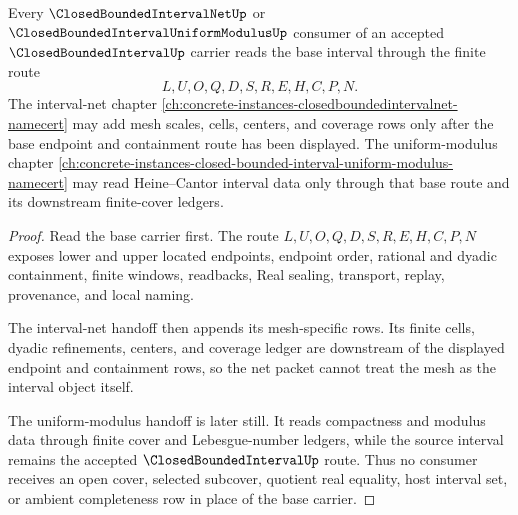 \begin{theorem}
\label{thm:closed-bounded-interval-net-handoff}
Every $\ClosedBoundedIntervalNetUp$ or $\ClosedBoundedIntervalUniformModulusUp$ consumer of an accepted $\ClosedBoundedIntervalUp$ carrier reads the base interval through the finite route
$$
L,U,O,Q,D,S,R,E,H,C,P,N.
$$
The interval-net chapter \autoref{ch:concrete-instances-closedboundedintervalnet-namecert} may add mesh scales, cells, centers, and coverage rows only after the base endpoint and containment route has been displayed. The uniform-modulus chapter \autoref{ch:concrete-instances-closed-bounded-interval-uniform-modulus-namecert} may read Heine--Cantor interval data only through that base route and its downstream finite-cover ledgers.
\end{theorem}
\begin{proof}
Read the base carrier first. The route $L,U,O,Q,D,S,R,E,H,C,P,N$ exposes lower and upper located endpoints, endpoint order, rational and dyadic containment, finite windows, readbacks, Real sealing, transport, replay, provenance, and local naming.

The interval-net handoff then appends its mesh-specific rows. Its finite cells, dyadic refinements, centers, and coverage ledger are downstream of the displayed endpoint and containment rows, so the net packet cannot treat the mesh as the interval object itself.

The uniform-modulus handoff is later still. It reads compactness and modulus data through finite cover and Lebesgue-number ledgers, while the source interval remains the accepted $\ClosedBoundedIntervalUp$ route. Thus no consumer receives an open cover, selected subcover, quotient real equality, host interval set, or ambient completeness row in place of the base carrier.
\end{proof}

